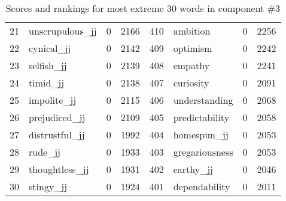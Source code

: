 \begin{table}[tbp]
\begin{tabular}{| rlr@{.}l | rlr@{.}l |}
    21 & unscrupulous\_jj & 0 & 2166    &    410 & ambition & 0 & 2256 \\
    22 & cynical\_jj & 0 & 2142    &    409 & optimism & 0 & 2242 \\
    23 & selfish\_jj & 0 & 2139    &    408 & empathy & 0 & 2241 \\
    24 & timid\_jj & 0 & 2138    &    407 & curiosity & 0 & 2091 \\
    25 & impolite\_jj & 0 & 2115    &    406 & understanding & 0 & 2068 \\
    26 & prejudiced\_jj & 0 & 2109    &    405 & predictability & 0 & 2058 \\
    27 & distrustful\_jj & 0 & 1992    &    404 & homespun\_jj & 0 & 2053 \\
    28 & rude\_jj & 0 & 1933    &    403 & gregariousness & 0 & 2053 \\
    29 & thoughtless\_jj & 0 & 1931    &    402 & earthy\_jj & 0 & 2046 \\
    30 & stingy\_jj & 0 & 1924    &    401 & dependability & 0 & 2011 \\
    \hline
    \end{tabular}
    \caption{Scores and rankings for most extreme 30 words in component \#3} 
\end{table}
\clearpage
